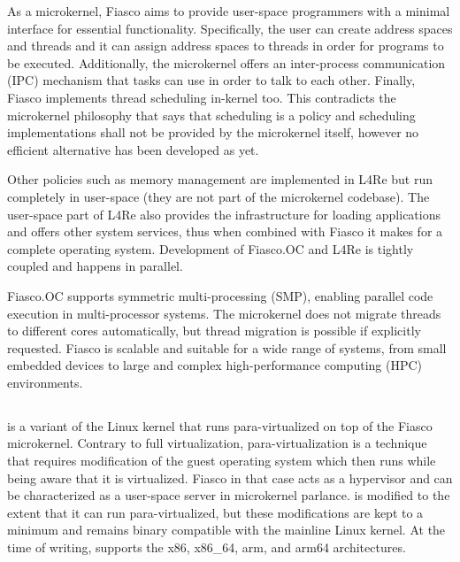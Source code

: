 As a microkernel, Fiasco aims to provide user-space programmers with a minimal
interface for essential functionality. Specifically, the user can create
address spaces and threads and it can assign address spaces to threads in order
for programs to be executed. Additionally, the microkernel offers an
inter-process communication (IPC) mechanism that tasks can use in order to talk
to each other. Finally, Fiasco implements thread scheduling in-kernel too.
This contradicts the microkernel philosophy that says that scheduling is a
policy and scheduling implementations shall not be provided by the microkernel
itself, however no efficient alternative has been developed as yet.

Other policies such as memory management are implemented in L4Re but run
completely in user-space (they are not part of the microkernel codebase). The
user-space part of L4Re also provides the infrastructure for loading
applications and offers other system services, thus when combined with Fiasco
it makes for a complete operating system. Development of Fiasco.OC and L4Re is
tightly coupled and happens in parallel.

Fiasco.OC supports symmetric multi-processing (SMP), enabling parallel code
execution in multi-processor systems. The microkernel does not migrate threads
to different cores automatically, but thread migration is possible if
explicitly requested. Fiasco is scalable and suitable for a wide range of
systems, from small embedded devices to large and complex high-performance
computing (HPC) environments.

\subsection{\llinux}

\llinux \cite{l4linux}\cite{l4_performance} is a variant of the Linux kernel
that runs para-virtualized on top of the Fiasco microkernel. Contrary to full
virtualization, para-virtualization is a technique that requires modification
of the guest operating system which then runs while being aware that it is
virtualized.  Fiasco in that case acts as a hypervisor and \llinux can be
characterized as a user-space server in microkernel parlance. \llinux is
modified to the extent that it can run para-virtualized, but these
modifications are kept to a minimum and \llinux remains binary compatible with
the mainline Linux kernel. At the time of writing, \llinux supports the x86,
x86\_64, arm, and arm64 architectures.

